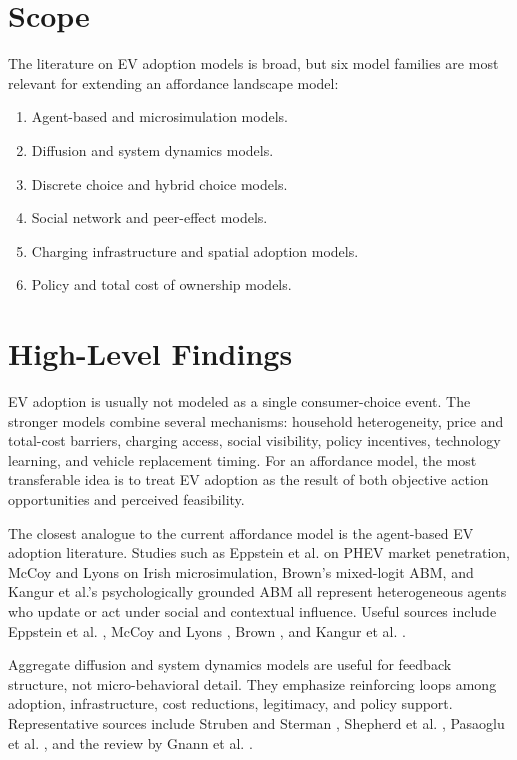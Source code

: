 \documentclass[11pt]{article}
\begin{document}
\section{Scope}

The literature on EV adoption models is broad, but six model families are most
relevant for extending an affordance landscape model:

\begin{enumerate}
    \item Agent-based and microsimulation models.
    \item Diffusion and system dynamics models.
    \item Discrete choice and hybrid choice models.
    \item Social network and peer-effect models.
    \item Charging infrastructure and spatial adoption models.
    \item Policy and total cost of ownership models.
\end{enumerate}

\section{High-Level Findings}

EV adoption is usually not modeled as a single consumer-choice event. The
stronger models combine several mechanisms: household heterogeneity, price and
total-cost barriers, charging access, social visibility, policy incentives,
technology learning, and vehicle replacement timing. For an affordance model,
the most transferable idea is to treat EV adoption as the result of both
objective action opportunities and perceived feasibility.

The closest analogue to the current affordance model is the agent-based EV
adoption literature. Studies such as Eppstein et al. on PHEV market penetration,
McCoy and Lyons on Irish microsimulation, Brown's mixed-logit ABM, and Kangur et
al.'s psychologically grounded ABM all represent heterogeneous agents who update
or act under social and contextual influence. Useful sources include
Eppstein et al. \cite{eppstein2011}, McCoy and Lyons \cite{mccoy2014},
Brown \cite{brown2013}, and Kangur et al. \cite{kangur2017}.

Aggregate diffusion and system dynamics models are useful for feedback
structure, not micro-behavioral detail. They emphasize reinforcing loops among
adoption, infrastructure, cost reductions, legitimacy, and policy support.
Representative sources include
Struben and Sterman \cite{struben2008}, Shepherd et al. \cite{shepherd2012},
Pasaoglu et al. \cite{pasaoglu2016}, and the review by Gnann et al.
\cite{gnann2018}.
\end{document}
